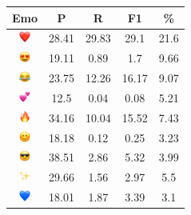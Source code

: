 \documentclass{article}
\begin{document}
\begin{table}
\centering
\begin{tabular}{|c|ccc|c|} \hline
\textbf{Emo} & \textbf{P} & \textbf{R} & \textbf{F1} & \textbf{\%} \\ \hline
\includegraphics[height=0.37cm,width=0.37cm]{img/red_heart.png} & 28.41 & 29.83 & 29.1 & 21.6\\ 
\includegraphics[height=0.37cm,width=0.37cm]{img/smiling_face_with_hearteyes.png} & 19.11 & 0.89 & 1.7 & 9.66\\ 
\includegraphics[height=0.37cm,width=0.37cm]{img/face_with_tears_of_joy.png} & 23.75 & 12.26 & 16.17 & 9.07\\ 
\includegraphics[height=0.37cm,width=0.37cm]{img/two_hearts.png} & 12.5 & 0.04 & 0.08 & 5.21\\ 
\includegraphics[height=0.37cm,width=0.37cm]{img/fire.png} & 34.16 & 10.04 & 15.52 & 7.43\\ 
\includegraphics[height=0.37cm,width=0.37cm]{img/smiling_face_with_smiling_eyes.png} & 18.18 & 0.12 & 0.25 & 3.23\\ 
\includegraphics[height=0.37cm,width=0.37cm]{img/smiling_face_with_sunglasses.png} & 38.51 & 2.86 & 5.32 & 3.99\\ 
\includegraphics[height=0.37cm,width=0.37cm]{img/sparkles.png} & 29.66 & 1.56 & 2.97 & 5.5\\ 
\includegraphics[height=0.37cm,width=0.37cm]{img/blue_heart.png} & 18.01 & 1.87 & 3.39 & 3.1\\ 

\end{tabular}
\end{table}
\end{document}
